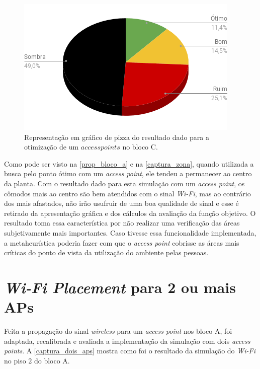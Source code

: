 \documentclass[
	12pt,				%
	twoside,			%
	a4paper,			%
	english,			%
	french,				%
	spanish,			%
	brazil				%
	]{abntex2}
\begin{document}
\begin{figure}[ht]
    \caption{\label{prop_bloco_percent_c_1} Representação em gráfico de pizza do resultado dado para a otimização
     de um $access points$ no bloco C.}
    \begin{center}
        \includegraphics[scale=0.7]{imagens/prop-bloco-percent-c-1.png}
    \end{center}
\end{figure}

Como pode ser visto na \autoref{prop_bloco_a} e na
\autoref{captura_zona}, quando utilizada a busca pelo ponto ótimo com um
\emph{access point}, ele tendeu a permanecer ao centro da planta. Com o
resultado dado para esta simulação com um \emph{access point}, os
cômodos mais ao centro são bem atendidos com o sinal \emph{Wi-Fi}, mas
ao contrário dos mais afastados, não irão usufruir de uma boa qualidade
de sinal e esse é retirado da apresentação gráfica e dos cálculos da
avaliação da função objetivo. O resultado toma essa característica por
não realizar uma verificação das áreas subjetivamente mais importantes.
Caso tivesse essa funcionalidade implementada, a metaheurística poderia
fazer com que o \emph{access point} cobrisse as áreas mais críticas do
ponto de vista da utilização do ambiente pelas pessoas.

\section{\texorpdfstring{\emph{Wi-Fi Placement} para 2 ou mais
APs}{Wi-Fi Placement para 2 ou mais APs}}\label{wi-fi-placement-para-2-ou-mais-aps}

Feita a propagação do sinal \emph{wireless} para um \emph{access point}
nos bloco A, foi adaptada, recalibrada e avaliada a implementação da
simulação com dois \emph{access points}. A \autoref{captura_dois_aps}
mostra como foi o resultado da simulação do \emph{Wi-Fi} no piso 2 do
bloco A.
\end{document}
